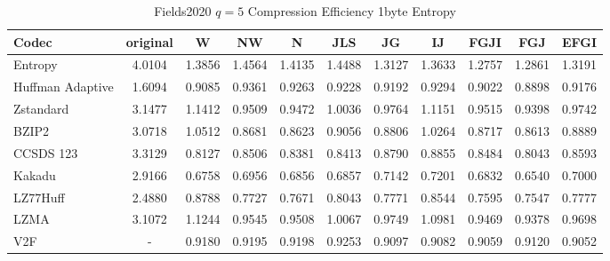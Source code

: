 \documentclass{article}
\begin{document}
\begin{table}[h!]
\centering
\caption{Fields2020 $q=5$ Compression Efficiency 1byte Entropy}
\begin{tabular}{|l|cccccccccc|}
\hline
Codec &  original &      W &     NW &      N &    JLS &     JG &     IJ &   FGJI &    FGJ &   EFGI \\
\hline
Entropy & 4.0104 & 1.3856 & 1.4564 & 1.4135 & 1.4488 & 1.3127 & 1.3633 & 1.2757 & 1.2861 & 1.3191 \\
\hline
Huffman Adaptive &    1.6094 & 0.9085 & 0.9361 & 0.9263 & 0.9228 & 0.9192 & 0.9294 & 0.9022 & 0.8898 & 0.9176 \\
Zstandard        &    3.1477 & 1.1412 & 0.9509 & 0.9472 & 1.0036 & 0.9764 & 1.1151 & 0.9515 & 0.9398 & 0.9742 \\
BZIP2            &    3.0718 & 1.0512 & 0.8681 & 0.8623 & 0.9056 & 0.8806 & 1.0264 & 0.8717 & 0.8613 & 0.8889 \\
CCSDS 123        &    3.3129 & 0.8127 & 0.8506 & 0.8381 & 0.8413 & 0.8790 & 0.8855 & 0.8484 & 0.8043 & 0.8593 \\
Kakadu           &    2.9166 & 0.6758 & 0.6956 & 0.6856 & 0.6857 & 0.7142 & 0.7201 & 0.6832 & 0.6540 & 0.7000 \\
LZ77Huff         &    2.4880 & 0.8788 & 0.7727 & 0.7671 & 0.8043 & 0.7771 & 0.8544 & 0.7595 & 0.7547 & 0.7777 \\
LZMA             &    3.1072 & 1.1244 & 0.9545 & 0.9508 & 1.0067 & 0.9749 & 1.0981 & 0.9469 & 0.9378 & 0.9698 \\
V2F              &    - & 0.9180 & 0.9195 & 0.9198 & 0.9253 & 0.9097 & 0.9082 & 0.9059 & 0.9120 & 0.9052 \\
\hline
\end{tabular}
\end{table}
\end{document}
